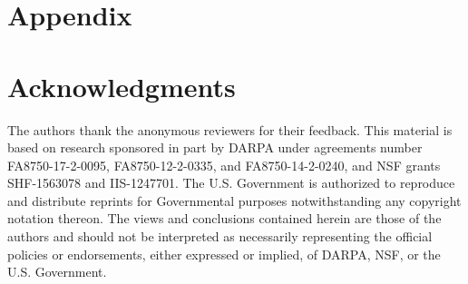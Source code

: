\documentclass[sigplan,screen]{acmart}
\begin{document}
\author{Stefan Hadjis}

\author{Ruben Fiszel}

\author{Tian Zhao}

\author{Luigi Nardi}

\author{Ardavan Pedram}

\author{Christos Kozyrakis}

\author{Kunle Olukotun}


\renewcommand{\shortauthors}{D. Koeplinger et al.}

\begin{abstract}

\end{abstract}


\maketitle










\appendix
\section{Appendix}


\section*{Acknowledgments}
\label{acknowledgements}
The authors thank the anonymous reviewers for their feedback.
This material is based on research sponsored in part by DARPA 
under agreements number FA8750-17-2-0095, FA8750-12-2-0335, and FA8750-14-2-0240,
and NSF grants SHF-1563078 and IIS-1247701.
The U.S. Government is authorized to reproduce and distribute reprints for Governmental purposes
notwithstanding any copyright notation thereon.
The views and conclusions contained herein are those of the authors and should not be
interpreted as necessarily representing the official policies or endorsements, either 
expressed or implied, of DARPA, NSF, or the U.S. Government.


\balance

\end{document}
